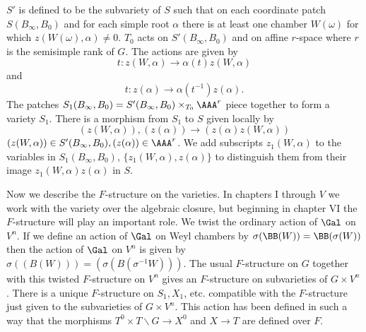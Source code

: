 \documentclass{memo-l}
\theoremstyle{definition}
\theoremstyle{remark}
\numberwithin{section}{chapter}
\numberwithin{equation}{chapter}
\begin{document}
$S'$ is defined to be the subvariety of $S$ such that on each
coordinate patch $S(B_{{\infty}},B_{0})$ and for each simple root
${\alpha}$ there is at least one chamber $W({\omega})$ for which
$z(W({\omega}),{\alpha})\ne 0$.  $T_{0}$ acts on
$S'(B_{{\infty}},B_{0})$ and on affine $r$-space where $r$ is the
semisimple rank of $G$.  The actions are given by
$$
t: z(W,{\alpha}) {\to} {\alpha}(t)z(W,{\alpha})
$$
and
$$
t: z({\alpha}) {\to} {\alpha}(t^{-1})z({\alpha}).
$$
The patches $S_{1}(B_{{\infty}},B_{0}) = S'(B_{{\infty}},B_{0}) \times_{T_0}
{\AAA}^{r}$ piece together to form a variety $S_{1}$.
 There is a morphism from $S_{1}$ to $S$ given locally by
$$
(z(W,{\alpha})),(z({\alpha})) {\to} (z({\alpha})z(W,{\alpha}))
$$
$(z(W,{\alpha})) \in S'(B_{{\infty}},B_{0}), (z({\alpha})) \in
{\AAA}^{{r}}$.  We add subscripts $z_1(W,\alpha)$ to the variables in
$S_1(B_\infty,B_0)$, $\{z_1(W,\alpha),z(\alpha)\}$ to distinguish them
from their image $z_1(W,\alpha)z(\alpha)$ in $S$.

   Now we describe the $F$-structure on the varieties.
 In chapters I through $V$ we work with the variety over the algebraic closure,
but beginning in chapter VI the $F$-structure will play an important role.
 We twist the ordinary action of $\Gal$ on $V^{n}$.   %
 If we define an action of $\Gal$ on Weyl chambers by
$\sigma({\BB}(W)) = {\BB}({\sigma}(W))$ then the action of
$\Gal$ on $V^{n}$ is given by ${\sigma}((B(W))) =
(\sigma(B({\sigma}^{-1}W)))$.
 The usual $F$-structure on $G$ together with this twisted $F$-structure on
$V^{n}$ gives an $F$-structure on subvarieties of $G \times V^{n}$.
 There is a unique $F$-structure on $S_{1}, X_{1}$, etc.
compatible with the $F$-structure just given to the
subvarieties of $G \times V^{n}$.
 This action has been defined in such a way that the morphisms
$T^{0} \times T\backslash G {\to} X^{0}$ and $X {\to} T$ are defined over $F$.
\end{document}
